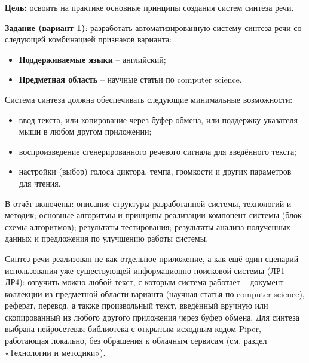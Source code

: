 
\textbf{Цель:} освоить на практике основные принципы создания систем
синтеза речи.

\vspace{1em}

\textbf{Задание (вариант 1)}: разработать автоматизированную систему
синтеза речи со следующей комбинацией признаков варианта:
\begin{itemize}
  \item \textbf{Поддерживаемые языки} -- английский;
  \item \textbf{Предметная область} -- научные статьи по
  computer science.
\end{itemize}

\vspace{1em}

Система синтеза должна обеспечивать следующие минимальные
возможности:
\begin{itemize}
  \item ввод текста, или копирование через буфер обмена, или поддержку
  указателя мыши в любом другом приложении;
  \item воспроизведение сгенерированного речевого сигнала для
  введённого текста;
  \item настройки (выбор) голоса диктора, темпа, громкости и других
  параметров для чтения.
\end{itemize}

В отчёт включены: описание структуры разработанной системы,
технологий и методик; основные алгоритмы и принципы реализации
компонент системы (блок-схемы алгоритмов); результаты тестирования;
результаты анализа полученных данных и предложения по улучшению
работы системы.

\vspace{1em}

Синтез речи реализован не как отдельное приложение, а как ещё один
сценарий использования уже существующей информационно-поисковой
системы (ЛР1--ЛР4): озвучить можно любой текст, с которым система
работает -- документ коллекции из предметной области варианта (научная
статья по computer science), реферат, перевод, а также произвольный
текст, введённый вручную или скопированный из любого другого
приложения через буфер обмена. Для синтеза выбрана нейросетевая
библиотека с открытым исходным кодом Piper, работающая локально, без
обращения к облачным сервисам (см. раздел «Технологии и методики»).
